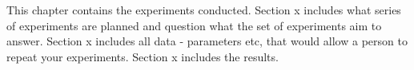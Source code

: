 

This chapter contains the experiments conducted. 
Section x includes what series of experiments are planned and question what the set of experiments aim to answer. 
Section x includes all data - parameters etc, that would allow a person to repeat your experiments.
Section x includes the results.

